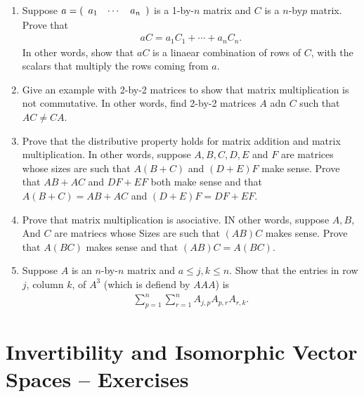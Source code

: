 \documentclass[10pt,a4paper]{report}
\begin{document}
\begin{enumerate}
\item Suppose $a = (\begin{array}{cccccccccc} a_1 & \cdots&a_n \end{array})$ is a 1-by-$n$ matrix and $C$ is a $n$-by$p$ matrix.  Prove that 
\begin{align*}
	aC=a_1C_1+\cdots+a_nC_n.
\end{align*}In other words, show that $aC$ is a linaear combination of rows of $C$, with the scalars that multiply the rows coming from $a$.

\item Give an example with 2-by-2 matrices to show that matrix multiplication is not commutative.  In other words, find 2-by-2 matrices $A$ adn $C$ such that $AC \ne CA$.

\item Prove that the distributive property holds for matrix addition and matrix multiplication.  In other words, suppose $A,B,C,D,E$ and $F$ are matrices whose sizes are such that $A(B+C)$ and $(D+E)F$ make sense.  Prove that $AB+AC$ and $DF+EF$ both make sense and that $A(B+C)=AB+AC$ and $(D+E)F=DF+EF$.

\item Prove that matrix multiplication is asociative.  IN other words, suppose $A,B$, And $C$ are matriecs whose Sizes are such that $(AB)C$ makes sense.  Prove that $A(BC)$ makes sense and that $(AB)C=A(BC)$.

\item Suppose $A$ is an $n$-by-$n$ matrix and $a \le j, k\le n$.  Show that the entries in row $j$, column $k$, of $A^3$ (which is defiend by $AAA$) is 
\begin{align*}
	\sum_{p=1}^n \sum_{r=1}^n A_{j,p}A_{p,r}A_{r,k}.
\end{align*}

\end{enumerate}

\section{Invertibility and Isomorphic Vector Spaces -- Exercises}
\end{document}
